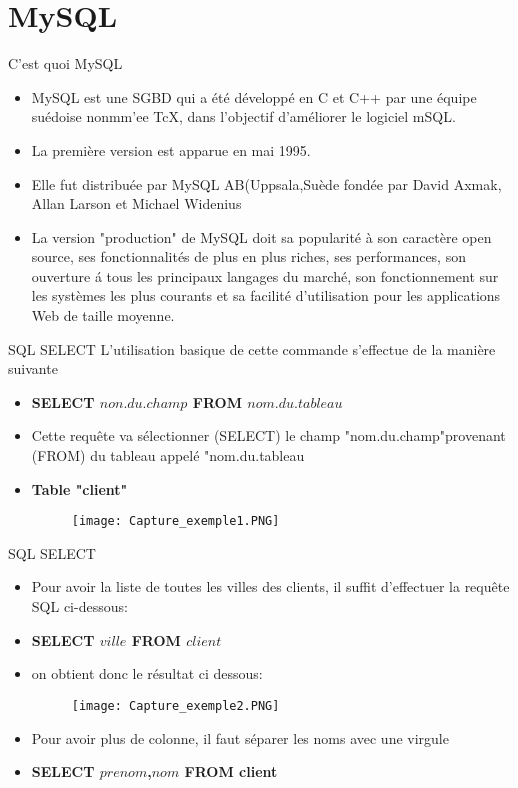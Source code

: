 \documentclass{beamer}
\begin{document}
\section{MySQL}
\begin{frame}{C'est quoi MySQL}
\begin{itemize}
    \item MySQL est une SGBD qui a \'et\'e d\'evelopp\'e en C et C++ par une \'equipe su\'edoise nonmm'ee TcX, dans l'objectif d'am\'eliorer le logiciel mSQL.
    \item La premi\`ere version est apparue en mai 1995.
    \item Elle fut distribuée par MySQL AB(Uppsala,Su\`ede fond\'ee par David Axmak, Allan Larson et Michael Widenius
    \item La version "production" de MySQL doit sa popularit\'e \`a son caract\`ere open source, ses fonctionnalit\'es de plus en plus riches, ses performances, son ouverture \'a tous les principaux langages du march\'e, son fonctionnement sur les syst\`emes les plus courants et sa facilit\'e d'utilisation pour les applications Web de taille moyenne.
\end{itemize}

    
\end{frame}
\begin{frame}{SQL SELECT}
L'utilisation basique de cette commande s'effectue de la mani\`ere suivante

\begin{itemize}
    \item \textbf{SELECT $non.du.champ$ FROM $nom.du.tableau$}
    \item Cette requ\^ete va s\'electionner (SELECT) le champ "nom.du.champ"provenant (FROM) du tableau appel\'e "nom.du.tableau
    \item \textbf{Table "client"}
        \begin{figure}[h]
\centering	
 \texttt{[image: Capture\_exemple1.PNG]}
\end{figure}

    
\end{itemize}    
\end{frame}
\begin{frame}{SQL SELECT}
\begin{itemize}
    \item Pour avoir la liste de toutes les villes des clients, il suffit d'effectuer la requ\^ete SQL ci-dessous:
    \item \textbf{SELECT $ville$ FROM $client$}
    \item on obtient donc le r\'esultat ci dessous:
           \begin{figure}[h]
\centering	
 \texttt{[image: Capture\_exemple2.PNG]}
\end{figure}
    
    \item Pour avoir plus de colonne, il faut s\'eparer les noms avec une virgule
    \item \textbf{SELECT $prenom$,$nom$ FROM client}
\end{itemize}
\end{frame}
\end{document}
